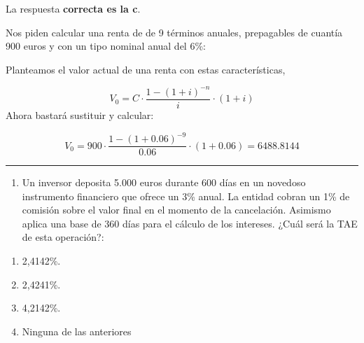 \documentclass[
  letterpaper,
  DIV=11,
  numbers=noendperiod]{scrreprt}
\providecommand{\tightlist}{%
  \setlength{\itemsep}{0pt}\setlength{\parskip}{0pt}}\usepackage{longtable,booktabs,array}
\begin{document}
\begin{tcolorbox}[enhanced jigsaw, left=2mm, opacityback=0, colback=white, breakable, arc=.35mm, bottomrule=.15mm, rightrule=.15mm, toprule=.15mm, leftrule=.75mm, colframe=quarto-callout-tip-color-frame]
\begin{minipage}[t]{5.5mm}
\textcolor{quarto-callout-tip-color}{\faLightbulb}
\end{minipage}%
\begin{minipage}[t]{\textwidth - 5.5mm}

La respuesta \textbf{correcta es la c}.

Nos piden calcular una renta de de 9 términos anuales, prepagables de
cuantía 900 euros y con un tipo nominal anual del 6\%:

Planteamos el valor actual de una renta con estas características,

\[V_0=C\cdot\frac{1-\left(1+i\right)^{-n}}{i}\cdot\left(1+i\right)\]
Ahora bastará sustituir y calcular:

\[V_0=900\cdot\frac{1-\left(1+0.06\right)^{-9}}{0.06}\cdot\left(1+0.06\right)=6488.8144\]

\end{minipage}%
\end{tcolorbox}

\begin{center}\rule{0.5\linewidth}{0.5pt}\end{center}

\begin{enumerate}
\def\labelenumi{\arabic{enumi}.}
\setcounter{enumi}{86}
\tightlist
\item
  Un inversor deposita 5.000 euros durante 600 días en un novedoso
  instrumento financiero que ofrece un 3\% anual. La entidad cobran un
  1\% de comisión sobre el valor final en el momento de la cancelación.
  Asimismo aplica una base de 360 días para el cálculo de los intereses.
  ¿Cuál será la TAE de esta operación?:
\end{enumerate}

\begin{enumerate}
\def\labelenumi{\alph{enumi}.}
\item
  2,4142\%.
\item
  2,4241\%.
\item
  4,2142\%.
\item
  Ninguna de las anteriores
\end{enumerate}
\end{document}
